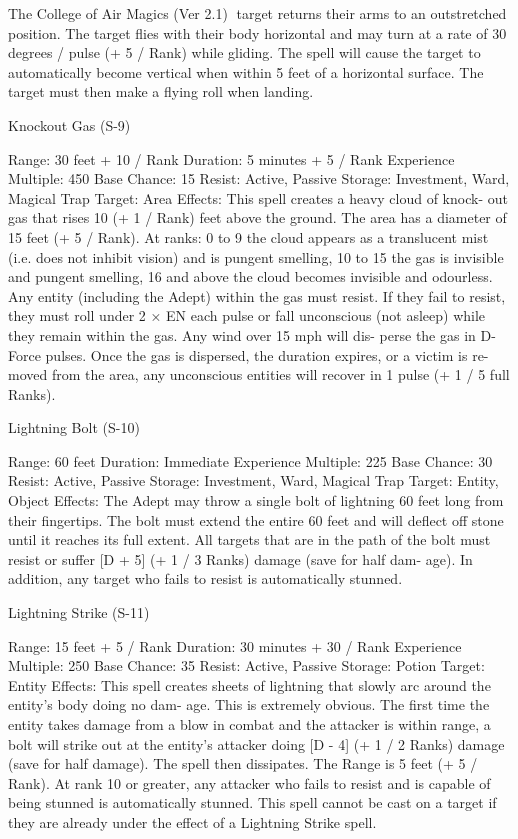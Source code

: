 \begin{Chapter}{The College of Air Magics (Ver 2.1)}
target returns their arms to an outstretched position. 
The target flies with their body horizontal and may 
turn  at  a  rate  of  30  degrees  /  pulse  (+  5  /  Rank) 
while  gliding.  The  spell  will  cause  the  target  to 
automatically  become  vertical  when  within  5  feet 
of a horizontal surface. The target must then make 
a flying roll when landing. 

Knockout Gas (S-9) 

Range: 30 feet + 10 / Rank 
Duration: 5 minutes + 5 / Rank 
Experience Multiple: 450 
Base Chance: 15%
Resist: Active, Passive 
Storage: Investment, Ward, Magical Trap 
Target: Area 
Effects: This spell creates a heavy cloud of knock-
out  gas  that  rises  10  (+  1  /  Rank)  feet  above  the 
ground.  The  area  has  a  diameter  of  15  feet  (+  5  / 
Rank).  At  ranks:  0  to  9  the  cloud  appears  as  a 
translucent mist (i.e. does not inhibit vision) and is 
pungent smelling, 10 to 15 the gas is invisible and 
pungent smelling, 16 and above the cloud becomes 
invisible  and  odourless.  Any  entity  (including  the 
Adept)  within  the  gas  must  resist.  If  they  fail  to 
resist,  they  must  roll  under  2  ×  EN  each  pulse  or 
fall  unconscious  (not  asleep)  while  they  remain 
within  the  gas.  Any  wind  over  15  mph  will  dis-
perse  the  gas  in  D-Force  pulses.  Once  the  gas  is 
dispersed,  the  duration  expires,  or  a  victim  is  re-
moved from the area, any unconscious entities will 
recover in 1 pulse (+ 1 / 5 full Ranks). 

Lightning Bolt (S-10) 

Range: 60 feet 
Duration: Immediate 
Experience Multiple: 225 
Base Chance: 30%
Resist: Active, Passive 
Storage: Investment, Ward, Magical Trap 
Target: Entity, Object 
Effects:  The  Adept  may  throw  a  single  bolt  of 
lightning  60  feet  long  from  their  fingertips.  The 
bolt must extend the entire 60 feet and will deflect 
off stone until it reaches its full extent. All targets 
that are in the path of the bolt must resist or suffer 
[D + 5] (+ 1 / 3 Ranks) damage (save for half dam-
age).  In  addition,  any  target  who  fails  to  resist  is 
automatically stunned. 

Lightning Strike (S-11) 

Range: 15 feet + 5 / Rank 
Duration: 30 minutes + 30 / Rank 
Experience Multiple: 250 
Base Chance: 35%
Resist: Active, Passive 
Storage: Potion 
Target: Entity 
Effects:  This  spell  creates  sheets  of  lightning  that 
slowly arc around the entity’s body doing no dam-
age.  This  is  extremely  obvious.  The  first  time  the 
entity takes damage from a blow in combat and the 
attacker is within range, a bolt will strike out at the 
entity’s  attacker  doing  [D  -  4]  (+  1  /  2  Ranks) 
damage  (save  for  half  damage).  The  spell  then 
dissipates.  The  Range  is  5  feet  (+  5  /  Rank).  At 
rank  10  or  greater,  any  attacker  who  fails  to  resist 
and  is  capable  of  being  stunned  is  automatically 
stunned.  This  spell  cannot  be  cast  on  a  target  if 
they  are  already  under  the  effect  of  a  Lightning 
Strike spell. 


\end{Chapter}
